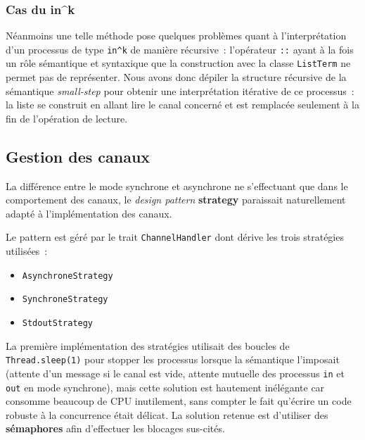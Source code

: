 \documentclass[11pt]{article} %
\begin{document}
\subsubsection{Cas du in\^{}k}
Néanmoins une telle méthode pose quelques problèmes quant à l'interprétation d'un processus de type \texttt{in\^{}k} de manière récursive~: l'opérateur \texttt{::} ayant à la fois un rôle sémantique et syntaxique que la construction avec la classe \texttt{ListTerm} ne permet pas de représenter. Nous avons donc dépiler la structure récursive de la sémantique \emph{small-step} pour obtenir une interprétation itérative de ce processus~: la liste se construit en allant lire le canal concerné et est remplacée seulement à la fin de l'opération de lecture.

\subsection{Gestion des canaux}

La différence entre le mode synchrone et asynchrone ne s'effectuant que dans le comportement des canaux, le \emph{design pattern} \textbf{strategy} paraissait naturellement adapté à l'implémentation des canaux.

Le pattern est géré par le trait \texttt{ChannelHandler} dont dérive les trois stratégies utilisées~:
\begin{itemize}
	\item \texttt{AsynchroneStrategy}
	\item \texttt{SynchroneStrategy}
	\item \texttt{StdoutStrategy}
\end{itemize}

La première implémentation des stratégies utilisait des boucles de \texttt{Thread.sleep(1)} pour stopper les processus lorsque la sémantique l'imposait (attente d'un message si le canal est vide, attente mutuelle des processus \texttt{in} et \texttt{out} en mode synchrone), mais cette solution est hautement inélégante car consomme beaucoup de CPU inutilement, sans compter le fait qu'écrire un code robuste à la concurrence était délicat. La solution retenue est d'utiliser des \textbf{sémaphores} afin d'effectuer les blocages sus-cités.
\end{document}
